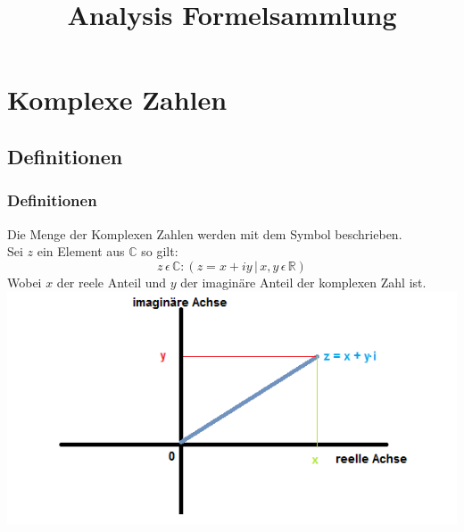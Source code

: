 \documentclass[a4paper]{scrartcl}
\title{Analysis Formelsammlung}
\begin{document}
    \maketitle
    \newpage
    \tableofcontents
    \newpage
    
    \section{Komplexe Zahlen}
        \subsection{Definitionen}
            \subsubsection{Definitionen}
                Die Menge der Komplexen Zahlen werden mit dem Symbol  beschrieben.\\
                Sei \(z\) ein Element aus \(\mathbb{C}\) so gilt:
                \begin{equation*}
                    z \, \epsilon \, \mathbb{C} : (z = x + iy \,|\, x,y \,\epsilon \, \mathbb{R})
                \end{equation*}
                Wobei \(x\) der reele Anteil und \(y\) der imaginäre Anteil der komplexen Zahl ist. \\
                \includegraphics{c}
            
\end{document}
